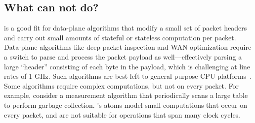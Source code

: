 \subsection{What can \absmachine not do?}
\label{ss:limitations}

\absmachine is a good fit for data-plane algorithms that modify a small set of
packet headers and carry out small amounts of stateful or stateless computation
per packet. Data-plane algorithms like deep packet inspection and WAN
optimization require a switch to parse and process the packet payload as
well---effectively parsing a large ``header'' consisting of each byte in the
payload, which is challenging at line rates of 1 GHz. Such algorithms are best
left to general-purpose CPU platforms~\cite{e2}.  Some algorithms require
complex computations, but not on every packet.  For example, consider a
measurement algorithm that periodically scans a large table to perform garbage
collection.  \absmachine's atoms model small computations that occur on every
packet, and are not suitable for operations that span many clock cycles.
